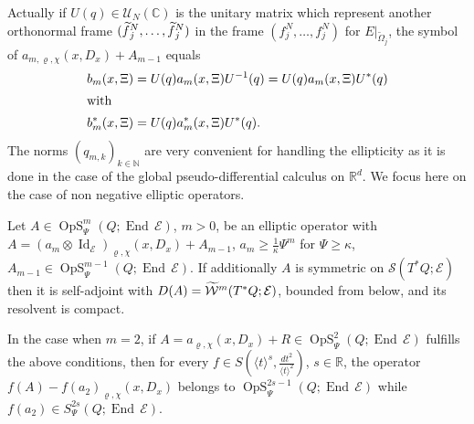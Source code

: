 \documentclass[10pt]{amsart}
\theoremstyle{definition}\newtheorem{defi}[theo]{Definition}\newtheorem{rema}[theo]{Remark}\newtheorem{exam}[theo]{Example}\newtheorem{exem}[theo]{Example}\newtheorem{nota}[theo]{Notation}
\newcommand{\C}{\mathbb{C}}
\newcommand{\R}{\mathbb{R}}
\newcommand{\N}{\mathbb{N}}
\newcommand{\clW}{\mathcal{W}}
\newcommand{\clE}{\mathcal{E}}
\newcommand{\clS}{\mathcal{S}}
\newcommand{\clU}{\mathcal{U}}
\DeclareMathOperator{\End}{End}
\DeclareMathOperator{\OpS}{OpS}
\DeclareMathOperator{\Idd}{Id}
\let\oldtilde\tilde
\renewcommand*{\tilde}[1]{\mathchoice{\widetilde{#1}}{\widetilde{#1}}{\oldtilde{#1}}{\oldtilde{#1}}}
\begin{document}
Actually if $U(q)\in \clU_{N}(\C)$ is the unitary matrix which represent another orthonormal frame $(\tilde{f}_{j}^{N},\dots,\tilde{f}_{j}^{N})$ in the frame $(f_{j}^{N},\dots,f_{j}^{N})$ for $E|_{\widetilde{\Omega}_{j}}$, the symbol of $a_{m,\varrho,\chi}(x,D_{x})+A_{m-1}$ equals
\begin{align*} b_{m}(x,\Xi)&=U(q)a_{m}(x,\Xi)U^{-1}(q)=U(q)a_{m}(x,\Xi)U^{*}(q)\\
\intertext{with} b_{m}^{*}(x,\Xi)&=U(q)a_{m}^{*}(x,\Xi)U^{*}(q).
\end{align*}
The norms $(q_{m,k})_{k\in \N}$ are very convenient for handling the ellipticity as it is done in the case of the global pseudo-differential calculus on $\R^{d}$. We focus here on the case of non negative elliptic operators.
\begin{prop}\label{pr:HeSj}
Let $A\in \OpS^{m}_{\Psi}(Q;\End\,\clE)$, $m>0$, be an elliptic operator with $A=(a_{m}\otimes \Idd_{\clE})_{\varrho,\chi}(x,D_{x})+A_{m-1}$, $a_{m}\geq \frac{1}{\kappa}\Psi^{m}$ for $\Psi\geq \kappa$, $A_{m-1}\in \OpS^{m-1}_{\Psi}(Q;\End\,\clE)$. If additionally $A$ is symmetric on $\clS(T^{*}Q;\clE)$ then it is self-adjoint with $D(A)=\tilde{\clW}^{m}(T^{*}Q;\clE)$, bounded from below, and its resolvent is compact.

In the case when $m=2$, if $A=a_{\varrho,\chi}(x,D_{x})+R\in \OpS^{2}_{\Psi}(Q;\End\,\clE)$ fulfills the above conditions, then for every $f\in S(\langle t\rangle^{s},\frac{dt^{2}}{\langle t\rangle^{2}})$, $s\in \R$, the operator $f(A)-f(a_{2})_{\varrho,\chi}(x,D_{x})$ belongs to $\OpS^{2s-1}_{\Psi}(Q;\End\,\clE)$ while $f(a_{2})\in S^{2s}_{\Psi}(Q;\End\,\clE)$.
\end{prop}
\end{document}
